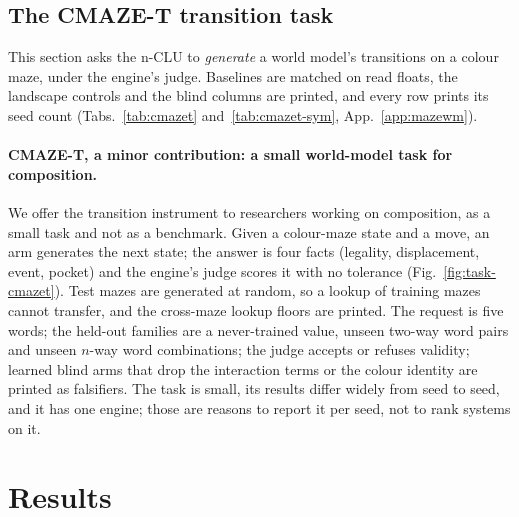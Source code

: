 \documentclass{article} %
\begin{document}
\subsection{The CMAZE-T transition task}
\label{sec:maze}

This section asks the n-CLU to \emph{generate} a world model's transitions on a colour maze, under
the engine's judge. Baselines are matched on read floats, the landscape controls and the blind columns
are printed, and every row prints its seed count (Tabs.~\ref{tab:cmazet} and~\ref{tab:cmazet-sym},
App.~\ref{app:mazewm}).

\paragraph{CMAZE-T, a minor contribution: a small world-model task for composition.} We offer the
transition instrument to researchers working on composition, as a small task and not as a benchmark.
Given a colour-maze state and a move, an arm generates the next state; the answer is four facts
(legality, displacement, event, pocket) and the engine's judge scores it with no tolerance
(Fig.~\ref{fig:task-cmazet}). Test mazes are generated at random, so a lookup of training mazes
cannot transfer, and the cross-maze lookup floors are printed. The request is five words; the
held-out families are a never-trained value, unseen two-way word pairs and unseen $n$-way word
combinations; the judge accepts or refuses validity; learned blind arms that drop the interaction
terms or the colour identity are printed as falsifiers. The task is small, its results differ widely from seed to seed, and it has one engine; those are
reasons to report it per seed, not to rank systems on it.

\section{Results}
\label{sec:results}
\end{document}
